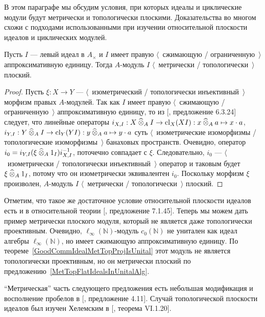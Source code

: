 В этом параграфе мы обсудим условия, при которых идеалы и циклические модули
будут метрически и топологически плоскими. Доказательства во многом схожи с
подходами использованными при изучении относительной плоскости идеалов и
циклических модулей.

\begin{proposition}\label{MetTopFlatIdealsInUnitalAlg} Пусть $I$ --- левый идеал
в $A_\times $ и $I$ имеет правую $\langle$~сжимающую / ограниченную~$\rangle$
аппроксимативную единицу. Тогда $A$-модуль $I$ $\langle$~метрически /
топологически~$\rangle$ плоский.
\end{proposition}
\begin{proof} Пусть $\xi:X\to Y$ --- $\langle$~изометрический / топологически
инъективный~$\rangle$ морфизм правых $A$-модулей. Так как $I$ имеет правую
$\langle$~сжимающую / ограниченную~$\rangle$ аппроксимативную единицу, то из
[\cite{HelBanLocConvAlg}, предложение 6.3.24] следует, что линейные операторы
$i_{X,I}:X\mathbin{\widehat{\otimes}}_{A} I\to \operatorname{cl}_X(XI):x\mathbin{\widehat{\otimes}}_{A} a\mapsto
x\cdot a$, $i_{Y,I}:Y\mathbin{\widehat{\otimes}}_{A} I\to
\operatorname{cl}_Y(YI):y\mathbin{\widehat{\otimes}}_{A} a\mapsto y\cdot a$ суть
$\langle$~изометрические изоморфизмы / топологические изоморфизмы~$\rangle$
банаховых пространств. Очевидно, оператор $i_0=i_{Y,I}(\xi\mathbin{\widehat{\otimes}}_{A}
1_I)i_{X,I}^{-1}$, поточечно совпадает с $\xi$. Следовательно, $i_0$ ---
$\langle$~изометрически / топологически инъективный~$\rangle$ оператор и таковым
будет $\xi\mathbin{\widehat{\otimes}}_{A} 1_I$, потому что он изометрически эквивалентен $i_0$.
Поскольку морфизм $\xi$ произволен, $A$-модуль $I$ $\langle$~метрически /
топологически~$\rangle$ плоский. 
\end{proof}

Отметим, что такое же достаточное условие относительной плоскости идеалов есть и
в относительной теории [\cite{HelBanLocConvAlg}, предложение 7.1.45]. Теперь мы
можем дать пример метрически плоского модуля, который не является даже
топологически проективным. Очевидно, $\ell_\infty(\mathbb{N})$-модуль
$c_0(\mathbb{N})$ не унитален как идеал алгебры $\ell_\infty(\mathbb{N})$, но
имеет сжимающую аппроксимативную единицу. По
теореме~\ref{GoodCommIdealMetTopProjIsUnital} этот модуль не является
топологически проективным, но он метрически плоский по
предложению~\ref{MetTopFlatIdealsInUnitalAlg}.

``Метрическая'' часть следующего предложения есть небольшая модификация и
восполнение пробелов в [\cite{WhiteInjmoduAlg}, предложение 4.11]. Случай
топологической плоскости идеалов был изучен Хелемским в
[\cite{HelHomolBanTopAlg}, теорема VI.1.20].

